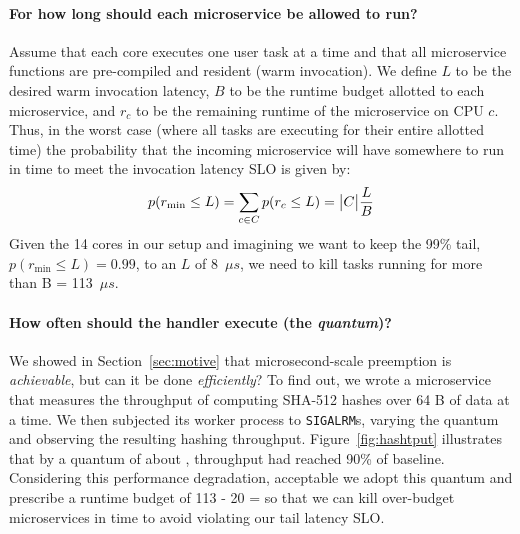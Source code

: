 \paragraph{For how long should each microservice be allowed to run?}
Assume that each core executes one user task at a
time and that all microservice
functions are pre-compiled and resident (warm invocation).
We define $L$ to be the desired warm invocation latency, $B$ to be the
runtime budget allotted to each microservice, and $r_c$ to be the remaining runtime
of the microservice on CPU $c$.  Thus, in the worst case (where all tasks are
executing for their entire allotted time) the probability that the incoming
microservice will have somewhere to run in time to meet the invocation
latency SLO is given by:
\vspace{-10pt}
\begin{equation}
p(r_\textrm{min} \le L) = \sum\limits_{c \in C} p(r_c \le L) = \big| C \big| \frac{L}{B}
\vspace{-10pt}
\end{equation}
Given the 14 cores in our setup and imagining we want to keep the 99\% tail,
$p(r_\textrm{min} \le L) = 0.99$, to an $L$ of 8~$\mu{}s$, we need to kill tasks
running for more than B = 113~$\mu{}s$.

\paragraph{How often should the handler execute (the \emph{quantum})?}
We showed in Section~\ref{sec:motive} that microsecond-scale preemption is
\textit{achievable}, but can it be done \textit{efficiently}?  To find out, we wrote
a microservice that measures the throughput of computing SHA-512 hashes over 64 B of
data at a time.  We then subjected its worker process to \texttt{SIGALRM}s, varying
the quantum and observing the resulting hashing throughput.
Figure~\ref{fig:hashtput} illustrates that by a quantum of about ,
throughput had reached 90\% of baseline.  Considering this performance degradation,
acceptable we adopt this quantum and prescribe a runtime budget of 113 - 20 = 
so that we can kill over-budget microservices in time to avoid violating our tail
latency SLO.

